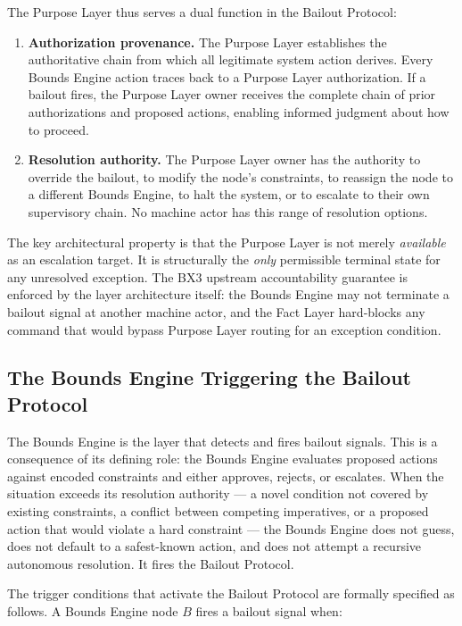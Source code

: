 The Purpose Layer thus serves a dual function in the Bailout Protocol:

\begin{enumerate}
\item \textbf{Authorization provenance.} The Purpose Layer establishes the authoritative chain from which all legitimate system action derives. Every Bounds Engine action traces back to a Purpose Layer authorization. If a bailout fires, the Purpose Layer owner receives the complete chain of prior authorizations and proposed actions, enabling informed judgment about how to proceed.
\item \textbf{Resolution authority.} The Purpose Layer owner has the authority to override the bailout, to modify the node's constraints, to reassign the node to a different Bounds Engine, to halt the system, or to escalate to their own supervisory chain. No machine actor has this range of resolution options.
\end{enumerate}

The key architectural property is that the Purpose Layer is not merely \textit{available} as an escalation target. It is structurally the \textit{only} permissible terminal state for any unresolved exception. The BX3 upstream accountability guarantee is enforced by the layer architecture itself: the Bounds Engine may not terminate a bailout signal at another machine actor, and the Fact Layer hard-blocks any command that would bypass Purpose Layer routing for an exception condition.

\subsection{The Bounds Engine Triggering the Bailout Protocol}
\label{sec:bounds-triggering}

The Bounds Engine is the layer that detects and fires bailout signals. This is a consequence of its defining role: the Bounds Engine evaluates proposed actions against encoded constraints and either approves, rejects, or escalates. When the situation exceeds its resolution authority --- a novel condition not covered by existing constraints, a conflict between competing imperatives, or a proposed action that would violate a hard constraint --- the Bounds Engine does not guess, does not default to a safest-known action, and does not attempt a recursive autonomous resolution. It fires the Bailout Protocol.

The trigger conditions that activate the Bailout Protocol are formally specified as follows. A Bounds Engine node $B$ fires a bailout signal when:

